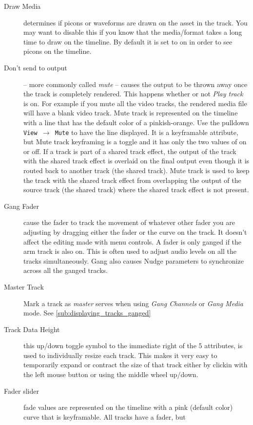 \begin{description}
\item[Draw Media] determines if picons or waveforms are drawn on
  the asset in the track.  You may want to disable this if you know
  that the media/format takes a long time to draw on the timeline.  By
  default it is set to on in order to see picons on the timeline.
\item[Don’t send to output] -- more commonly called
  \textit{mute} -- causes the output to be thrown away once the track is
  completely rendered. This happens whether or not \textit{Play track}
  is on.  For example if you mute all the video tracks, the rendered
  media file will have a blank video track.  Mute track is represented
  on the timeline with a line that has the default color of a
  pinkish-orange.  Use the pulldown \texttt{View $\rightarrow$ Mute} to
  have the line displayed.  It is a keyframable attribute, but Mute
  track keyframing is a toggle and it has only the two values of on or
  off. If a track is part of a shared track effect, the output of the
  track with the shared track effect is overlaid on the final output
  even though it is routed back to another track (the shared track).
  Mute track is used to keep the track with the shared track effect
  from overlapping the output of the source track (the shared track)
  where the shared track effect is not present.
\item[Gang Fader] cause the fader to track the movement of
  whatever other fader you are adjusting by dragging either the fader
  or the curve on the track.  It doesn't affect the editing made with
  menu controls.  A fader is only ganged if the arm track is also on.
  This is often used to adjust audio levels on all the tracks
  simultaneously.  Gang also causes Nudge parameters to synchronize
  across all the ganged tracks.
\item[Master Track] Mark a track as \textit{master} serves when using \textit{Gang Channels} or \textit{Gang Media} mode. See \ref{sub:displaying_tracks_ganged}
\item[Track Data Height] this up/down toggle symbol to the immediate right
of the 5 attributes, is used to individually resize each track.  This makes
it very easy to temporarily expand or contract the size of that track either
by clickin with the left mouse button or using the middle wheel up/down.
\item[Fader slider] fade values are represented on the timeline
  with a pink (default color) curve that is keyframable.  All tracks have a fader, but

\end{description}
